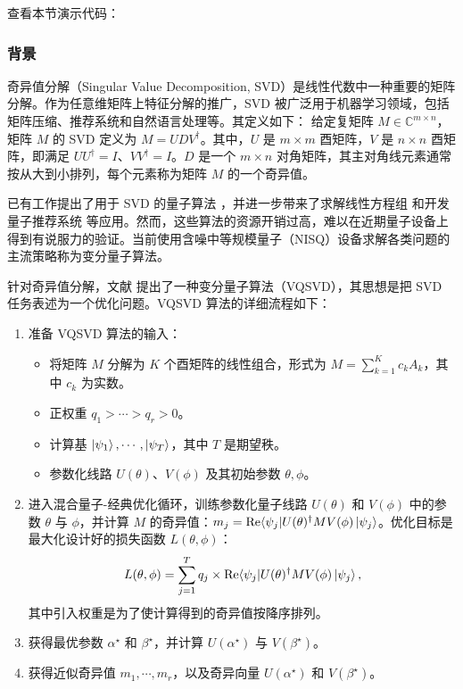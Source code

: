 查看本节演示代码： \ 

\subsubsection{背景}
奇异值分解（Singular Value Decomposition, SVD）是线性代数中一种重要的矩阵分解。作为任意维矩阵上特征分解的推广，SVD 被广泛用于机器学习领域，包括矩阵压缩、推荐系统和自然语言处理等。其定义如下：
给定复矩阵 $M \in \mathbb{C}^{m \times n}$，矩阵 $M$ 的 SVD 定义为 $M = UDV^\dagger$。其中，$U$ 是 $m \times m$ 酉矩阵，$V$ 是 $n \times n$ 酉矩阵，即满足 $UU^\dagger = I$、$VV^\dagger = I$。$D$ 是一个 $m \times n$ 对角矩阵，其主对角线元素通常按从大到小排列，每个元素称为矩阵 $M$ 的一个奇异值。


已有工作提出了用于 SVD 的量子算法 \cite{kerenidis2016quantum, rebentrost2018quantum}，并进一步带来了求解线性方程组 \cite{wossnig2018quantum} 和开发量子推荐系统 \cite{kerenidis2016quantum} 等应用。然而，这些算法的资源开销过高，难以在近期量子设备上得到有说服力的验证。当前使用含噪中等规模量子（NISQ）设备求解各类问题的主流策略称为变分量子算法。

针对奇异值分解，文献 \cite{wang2021variational} 提出了一种变分量子算法（VQSVD），其思想是把 SVD 任务表述为一个优化问题。VQSVD 算法的详细流程如下：
\begin{enumerate}
    \item 准备 VQSVD 算法的输入：
        \begin{itemize}
            \item 将矩阵 $M$ 分解为 $K$ 个酉矩阵的线性组合，形式为 $M = \sum_{k=1}^K c_k A_k$，其中 $c_k$ 为实数。
            \item 正权重 $q_1 > \cdots > q_r > 0$。
            \item 计算基 {$\ket{\psi_1}, \cdots, \ket{\psi_T}$}，其中 $T$ 是期望秩。
            \item 参数化线路 $U(\theta)$、$V(\phi)$ 及其初始参数 $\theta, \phi$。
        \end{itemize}
    \item 进入混合量子-经典优化循环，训练参数化量子线路 $U(\theta)$ 和 $V(\phi)$ 中的参数 $\theta$ 与 $\phi$，并计算 $M$ 的奇异值：$m_j = \text{Re}\langle\psi_j|U(\theta)^{\dagger} M V(\phi)\ket{\psi_j}$。优化目标是最大化设计好的损失函数 $L(\theta, \phi)$：
    \begin{equation}
        L(\theta, \phi) = \sum_{j=1}^T q_j \times \text{Re} \langle\psi_j| U(\theta)^{\dagger} M V(\phi)\ket{\psi_j},
    \end{equation}
    其中引入权重是为了使计算得到的奇异值按降序排列。
    \item 获得最优参数 $\alpha^ \star$ 和 $\beta^\star$，并计算 $U(\alpha^\star)$ 与 $V(\beta^\star)$。
    \item 获得近似奇异值 ${m_1, \cdots, m_r}$，以及奇异向量 $U(\alpha^\star)$ 和 $V(\beta^\star)$。
\end{enumerate}

